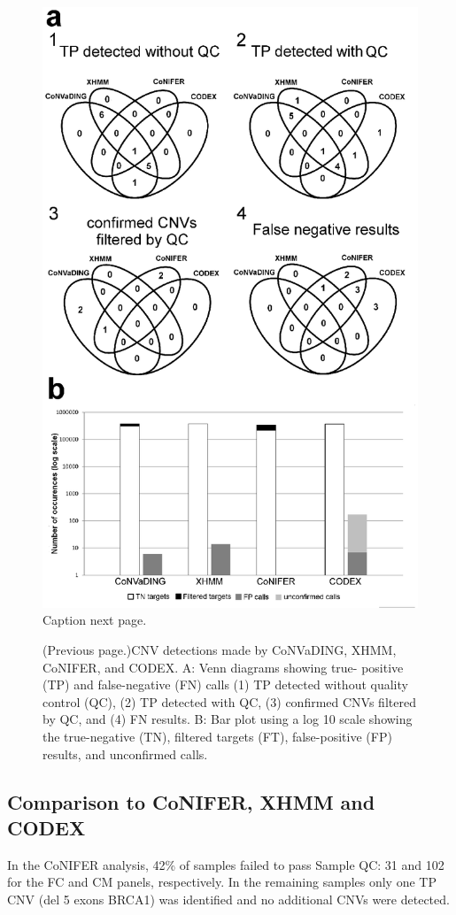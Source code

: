 \begin{figure}
	\includegraphics[width=0.9\linewidth]{img/CoNVaDING_Fig3}
	\caption[CNV detections CoNVaDING, XHMM, CoNIFER, and CODEX]{Caption next page.}
	\label{fig:CoNVaDING_Fig3}
\end{figure}
\addtocounter{figure}{-1}
\begin{figure}
	\caption[]{(Previous page.)CNV detections made by CoNVaDING, XHMM, CoNIFER, and CODEX. A: Venn diagrams showing true- positive (TP) and false-negative (FN) calls (1) TP detected without quality control (QC), (2) TP detected with QC, (3) confirmed CNVs filtered by QC, and (4) FN results. B: Bar plot using a log 10 scale showing the true-negative (TN), filtered targets (FT), false-positive (FP) results, and unconfirmed calls.}
\end{figure}

\subsection{Comparison to CoNIFER, XHMM and CODEX}
In the CoNIFER analysis, 42\% of samples failed to pass Sample QC: 31 and 102 for the FC and CM panels, respectively. 
In the remaining samples only one TP CNV (del 5 exons BRCA1) was identified and no additional CNVs were detected. 

